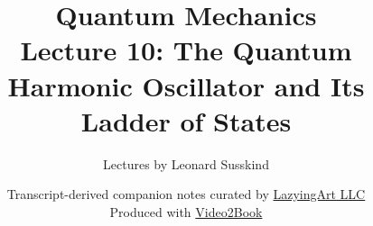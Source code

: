 \documentclass[11pt,oneside]{book}
\begin{document}
\hypersetup{pageanchor=false}
\frontmatter
\title{Quantum Mechanics\\[0.45em]
\large Lecture 10: The Quantum Harmonic Oscillator and Its Ladder of States}
\author{Lectures by Leonard Susskind}
\date{Transcript-derived companion notes curated by
\href{https://lazying.art}{LazyingArt LLC}\\[0.35em]
\small Produced with
\href{https://github.com/lachlanchen/Video2Book}{Video2Book}}
\maketitle
\hypersetup{pageanchor=true}
\mainmatter

\end{document}
